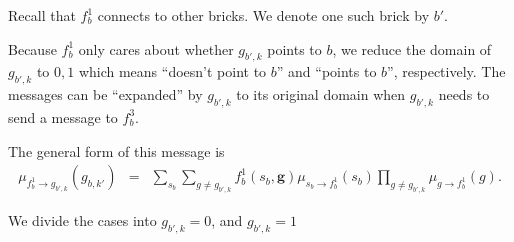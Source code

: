 \documentclass[11pt]{article}
\newcommand{\fb}[1]{f_b^{#1}}
\newcommand{\mSbFb}[1]{\mu_{s_{b} \rightarrow \fb{#1}}}
\begin{document}
Recall that $\fb1$ connects to other bricks. We denote one such brick by $b'$.

Because $\fb1$ only cares about whether $g_{b',k}$ points to $b$, we reduce the domain of $g_{b',k}$ to $0,1$ which means ``doesn't point to $b$'' and ``points to $b$'', respectively. The messages can be ``expanded'' by $g_{b',k}$ to its original domain when $g_{b',k}$ needs to send a message to $\fb3$.

The general form of this message is
\begin{eqnarray}
\mu_{\fb1 \rightarrow g_{b',k}}(g_{b,k'}) &=& \sum_{s_b} \sum_{g \neq g_{b',k}} \fb1(s_b,\mathbf{g}) \mSbFb1(s_b) \prod_{g \neq g_{b',k}} \mu_{g \rightarrow \fb1}(g).
\end{eqnarray}

We divide the cases into  $g_{b',k}=0$, and  $g_{b',k}=1$
\end{document}
